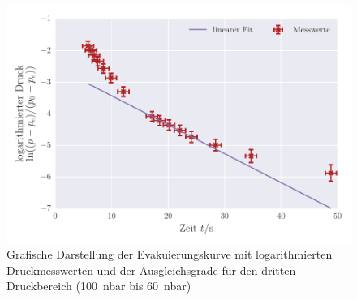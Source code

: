 \begin{figure}[!h]
 \centering
 \includegraphics[scale=0.8]{../Grafiken/Evakuierungskurve_Turbo_log_2.pdf}
 \caption{Grafische Darstellung der Evakuierungskurve mit logarithmierten Druckmesswerten und der Ausgleichsgrade für den dritten Druckbereich (\SI{100}{\nano\bar} bis \SI{60}{\nano\bar})\label{fig:evakuierungskurve_turbo_log_2}}
 \end{figure} 